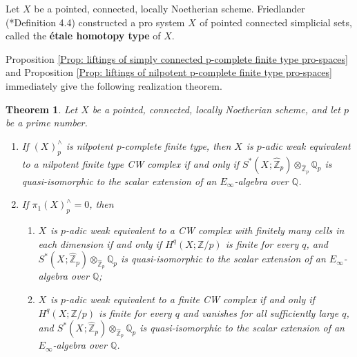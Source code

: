 \documentclass[11pt]{amsart}
\newtheorem{theorem}{Theorem}[section]
\theoremstyle{definition}
\numberwithin{equation}{section}
\numberwithin{equation}{section}
\newcommand\QQ{\mathbb{Q}}
\newcommand\ZZ{\mathbb{Z}}
\DeclareMathOperator{\et}{\acute{e}t}
\begin{document}
Let $X$ be a pointed, connected, locally Noetherian scheme. Friedlander (\cite{Friedlander-etale-homotopy}*{Definition 4.4}) constructed a pro system $X_{\et}$ of pointed connected simplicial sets, called the \textbf{\'etale homotopy type} of $X$.

Proposition \ref{Prop: liftings of simply connected p-complete finite type pro-spaces} and Proposition \ref{Prop: liftings of nilpotent p-complete finite type pro-spaces} immediately give the following realization theorem.

\begin{theorem}\label{Thm: finite CW complex realizations of a locally noetherian scheme}
Let $X$ be a pointed, connected, locally Noetherian scheme, and let $p$ be a prime number. 
\begin{enumerate}[leftmargin=0.25in]
    \item If $(X_{\et})^{\wedge}_p$ is nilpotent $p$-complete finite type, then $X_{\et}$ is $p$-adic weak equivalent to a nilpotent finite type CW complex if and only if $S^*(X_{\et};\widehat{\ZZ}_p)\otimes_{\widehat{\ZZ}_p} \QQ_p$ is quasi-isomorphic to the scalar extension of an $E_{\infty}$-algebra over $\QQ$.
    \item If $\pi_1^{\et}(X)^{\wedge}_p=0$, then 
    \begin{enumerate}[leftmargin=0.27in]
        \item $X_{\et}$ is $p$-adic weak equivalent to a CW complex with finitely many cells in each dimension if and only if $H^q_{\et}(X;\ZZ/p)$ is finite for every $q$, and $S^*(X_{\et};\widehat{\ZZ}_p)\otimes_{\widehat{\ZZ}_p} \QQ_p$ is quasi-isomorphic to the scalar extension of an $E_{\infty}$-algebra over $\QQ$;
        \item $X_{\et}$ is $p$-adic weak equivalent to a finite CW complex if and only if $H^q_{\et}(X;\ZZ/p)$ is finite for every $q$ and vanishes for all sufficiently large $q$, and $S^*(X_{\et};\widehat{\ZZ}_p)\otimes_{\widehat{\ZZ}_p} \QQ_p$ is quasi-isomorphic to the scalar extension of an $E_{\infty}$-algebra over $\QQ$.
    \end{enumerate}
\end{enumerate}
\end{theorem}
\end{document}
